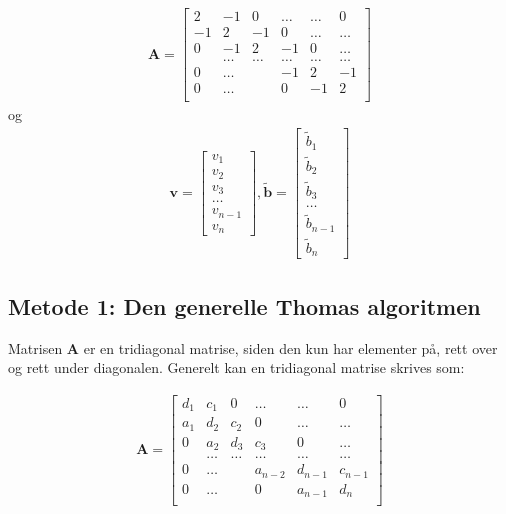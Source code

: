 \documentclass[reprint,english,notitlepage]{revtex4-1}
\begin{document}
	\begin{equation*}
	\begin{aligned}
	\mathbf{A} = \begin{bmatrix}
	2& -1& 0 &\dots   & \dots &0 \\
	-1 & 2 & -1 &0 &\dots &\dots \\
	0&-1 &2 & -1 & 0 & \dots \\
	& \dots   & \dots &\dots   &\dots & \dots \\
	0&\dots   &  &-1 &2& -1 \\
	0&\dots    &  & 0  &-1 & 2 \\
	\end{bmatrix}
	\end{aligned}
	\end{equation*}
	og 
	\begin{equation*}
	\begin{aligned}
	\mathbf{v} = \begin{bmatrix}
	v_1 \\
	v_2 \\
	v_3 \\
	\dots \\
	v_{n-1} \\
	v_{n}
	\end{bmatrix},
	\tilde{\mathbf{b}} = \begin{bmatrix}
	\tilde{b}_1 \\
	\tilde{b}_2 \\
	\tilde{b}_3 \\
	\dots \\
	\tilde{b}_{n-1} \\
	\tilde{b}_{n}
	\end{bmatrix}
	\end{aligned}
	\end{equation*}

\subsection{Metode 1: Den generelle Thomas algoritmen}
	Matrisen $\mathbf{A}$ er en tridiagonal matrise, siden den kun har elementer på, rett over og rett under diagonalen. Generelt kan en tridiagonal matrise skrives som:
	
	\begin{equation*}
	\begin{aligned}
	\mathbf{A} = \begin{bmatrix}
	d_1 & c_1 & 0 &\dots   & \dots &0 \\
	a_1 & d_2 & c_2 &0 &\dots &\dots \\
	0& a_2 & d_3 & c_3 & 0 & \dots \\
	& \dots   & \dots &\dots   &\dots & \dots \\
	0&\dots   &  &a_{n-2} & d_{n-1} & c_{n-1} \\
	0&\dots    &  & 0  &a_{n-1} & d_n \\
	\end{bmatrix}
	\end{aligned}
	\end{equation*}
	
\end{document}
